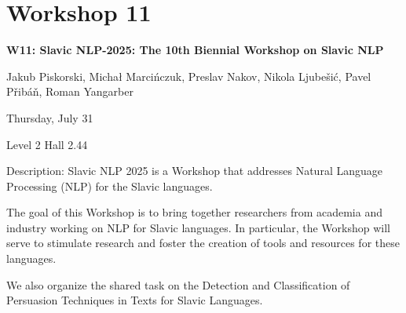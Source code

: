 \clearpage



\section[W11: Slavic NLP-2025: The 10th Biennial Workshop on Slavic NLP]{Workshop 11}
\label{workshop_11}

\begin{center}
    {\Large \textbf{W11: Slavic NLP-2025: The 10th Biennial Workshop on Slavic NLP}}

   Jakub Piskorski, Michał Marcińczuk, Preslav Nakov, Nikola Ljubešić, Pavel Přibáň, Roman Yangarber

    Thursday, July 31
    
   Level 2 Hall 2.44

\end{center}

Description: Slavic NLP 2025 is a Workshop that addresses Natural Language Processing (NLP) for the Slavic languages.

The goal of this Workshop is to bring together researchers from academia and industry working on NLP for Slavic languages. In particular, the Workshop will serve to stimulate research and foster the creation of tools and resources for these languages.

We also organize the shared task on the Detection and Classification of Persuasion Techniques in Texts for Slavic Languages.

